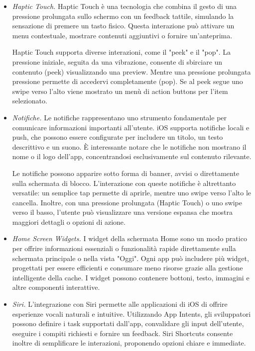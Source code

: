 \begin{itemize}
    \item \textit{Haptic Touch.} Haptic Touch è una tecnologia che combina il gesto di una pressione prolungata sullo schermo con un feedback tattile, simulando la sensazione di premere un tasto fisico. Questa interazione può attivare un menu contestuale, mostrare contenuti aggiuntivi o fornire un'anteprima.

    Haptic Touch supporta diverse interazioni, come il "peek" e il "pop". La pressione iniziale, seguita da una vibrazione, consente di sbirciare un contenuto (peek) visualizzando una preview. Mentre una pressione prolungata pressione permette di accedervi completamente (pop). Se al peek segue uno swipe verso l'alto viene mostrato un menù di action buttons per l'item selezionato.

    \item \textit{Notifiche.} Le notifiche rappresentano uno strumento fondamentale per comunicare informazioni importanti all'utente. iOS supporta notifiche locali e push, che possono essere configurate per includere un titolo, un testo descrittivo e un suono. È interessante notare che le notifiche non mostrano il nome o il logo dell'app, concentrandosi esclusivamente sul contenuto rilevante.

    Le notifiche possono apparire sotto forma di banner, avvisi o direttamente sulla schermata di blocco. L'interazione con queste notifiche è altrettanto versatile: un semplice tap permette di aprirle, mentre uno swipe verso l'alto le cancella. Inoltre, con una pressione prolungata (Haptic Touch) o uno swipe verso il basso, l'utente può visualizzare una versione espansa che mostra maggiori dettagli o opzioni di azione.

    \item \textit{Home Screen Widgets.} I widget della schermata Home sono un modo pratico per offrire informazioni essenziali o funzionalità rapide direttamente sulla schermata principale o nella vista "Oggi". Ogni app può includere più widget, progettati per essere efficienti e consumare meno risorse grazie alla gestione intelligente della cache. I widget possono contenere bottoni, testo, immagini e altre componenti interattive.

    \item \textit{Siri.} L'integrazione con Siri permette alle applicazioni di iOS di offrire esperienze vocali naturali e intuitive. Utilizzando App Intents, gli sviluppatori possono definire i task supportati dall'app, convalidare gli input dell'utente, eseguire i compiti richiesti e fornire un feedback. Siri Shortcuts consente inoltre di semplificare le interazioni, proponendo opzioni chiare e immediate.
\end{itemize}

